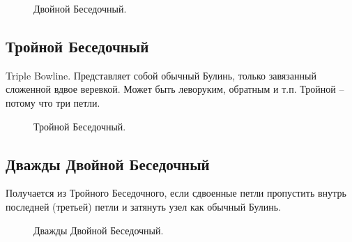 \begin{figure}[H]\centering
	\subfloat[Завязывание]{\label{ris:Double_Bowline_1}
	\tcbox[enhanced jigsaw,colframe=black,opacityframe=0.5,opacityback=0.5]
		{\centering
			}
		}
\end{figure}

\begin{figure}[H]\centering
	\subfloat[Результат]{\label{ris:Double_Bowline_2}
	\tcbox[enhanced jigsaw,colframe=black,opacityframe=0.5,opacityback=0.5]
		{\centering
			}
		}
	\caption{Двойной Беседочный.}\label{ris:Double_Bowline}
\end{figure}

\subsection{Тройной Беседочный}

Triple Bowline. Представляет собой обычный Булинь, только завязанный сложенной вдвое веревкой. Может быть леворуким, обратным и т.п. Тройной --потому что три петли.

\begin{figure}[H]\centering
	\subfloat[Завязывание]{\label{ris:Triple_Bowline_1}
	\tcbox[enhanced jigsaw,colframe=black,opacityframe=0.5,opacityback=0.5]
		{\centering
			}
		}
\end{figure}

\begin{figure}[H]\centering
	\subfloat[Результат]{\label{ris:Triple_Bowline_2}
	\tcbox[enhanced jigsaw,colframe=black,opacityframe=0.5,opacityback=0.5]
		{\centering
			}
		}
	\caption{Тройной Беседочный.}\label{ris:Triple_Bowline}
\end{figure}

\subsection{Дважды Двойной Беседочный}

Получается из Тройного Беседочного, если сдвоенные петли пропустить внутрь последней (третьей) петли и затянуть узел как обычный Булинь.

\begin{figure}[H]\centering
	\begin{minipage}{1\linewidth}
		\begin{center}
			\tcbox[enhanced jigsaw,colframe=black,opacityframe=0.5,opacityback=0.5]
			{\centering{}}
		\end{center}
	\end{minipage}
\caption{Дважды Двойной Беседочный.}
\label{ris:Double_Double_Bowline}
\end{figure}

